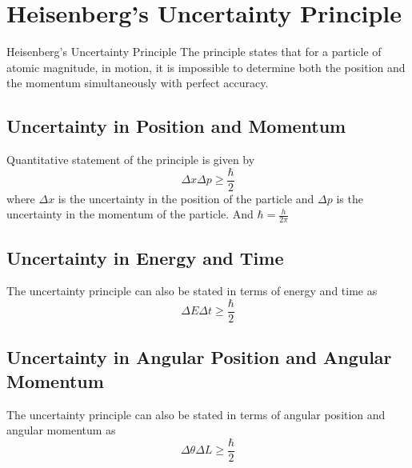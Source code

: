 \documentclass[12pt]{article}
\numberwithin{equation}{subsection}
\begin{document}

\section{Heisenberg's Uncertainty Principle}

\begin{definition}{Heisenberg's Uncertainty Principle}{}
    The principle states that for a particle of atomic magnitude, in motion, it is impossible to determine both the position and the momentum simultaneously with perfect accuracy.
\end{definition}

\subsection{Uncertainty in Position and Momentum}
Quantitative statement of the principle is given by
\begin{equation}
    \boxed{ \Delta x \Delta p \geq \frac{\hbar}{2} }
\end{equation}
where $\Delta x$ is the uncertainty in the position of the particle and $\Delta p$ is the uncertainty in the momentum of the particle. And $\displaystyle \hbar = \frac{h}{2\pi}$ \\

\subsection{Uncertainty in Energy and Time}
The uncertainty principle can also be stated in terms of energy and time as
\begin{equation}
    \boxed{ \Delta E \Delta t \geq \frac{\hbar}{2} }
\end{equation}

\subsection{Uncertainty in Angular Position and Angular Momentum}
The uncertainty principle can also be stated in terms of angular position and angular momentum as
\begin{equation}
    \boxed{ \Delta \theta \Delta L \geq \frac{\hbar}{2} }
\end{equation}
\end{document}
